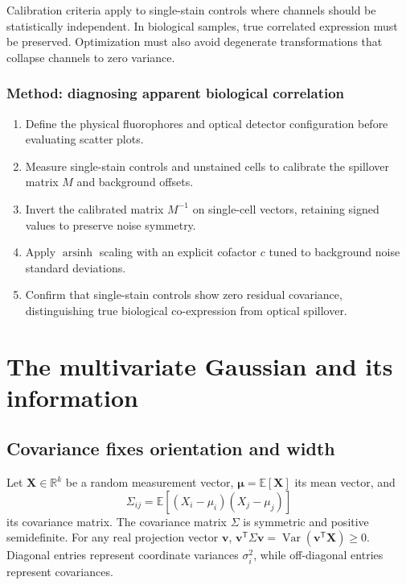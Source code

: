 Calibration criteria apply to single-stain controls where channels should be statistically independent. In biological samples, true correlated expression must be preserved. Optimization must also avoid degenerate transformations that collapse channels to zero variance.

\subsubsection*{Method: diagnosing apparent biological correlation}
\begin{enumerate}
\item Define the physical fluorophores and optical detector configuration before evaluating scatter plots.
\item Measure single-stain controls and unstained cells to calibrate the spillover matrix $M$ and background offsets.
\item Invert the calibrated matrix $M^{-1}$ on single-cell vectors, retaining signed values to preserve noise symmetry.
\item Apply $\operatorname{arsinh}$ scaling with an explicit cofactor $c$ tuned to background noise standard deviations.
\item Confirm that single-stain controls show zero residual covariance, distinguishing true biological co-expression from optical spillover.
\end{enumerate}

\section{The multivariate Gaussian and its information}
\label{sec:l05-multivariate}
\subsection{Covariance fixes orientation and width}
\label{subsec:l05-mvnormal}
Let $\mathbf X\in\mathbb R^k$ be a random measurement vector, $\boldsymbol\mu=\mathbb E[\mathbf X]$ its mean vector, and
\begin{equation}
\Sigma_{ij}=\mathbb E[(X_i-\mu_i)(X_j-\mu_j)]
\label{eq:l05-cov-definition}
\end{equation}
its covariance matrix. The covariance matrix $\Sigma$ is symmetric and positive semidefinite. For any real projection vector $\mathbf v$, $\mathbf v^{\mathsf T}\Sigma\mathbf v = \operatorname{Var}(\mathbf v^{\mathsf T}\mathbf X) \geq 0$. Diagonal entries represent coordinate variances $\sigma_i^2$, while off-diagonal entries represent covariances.

